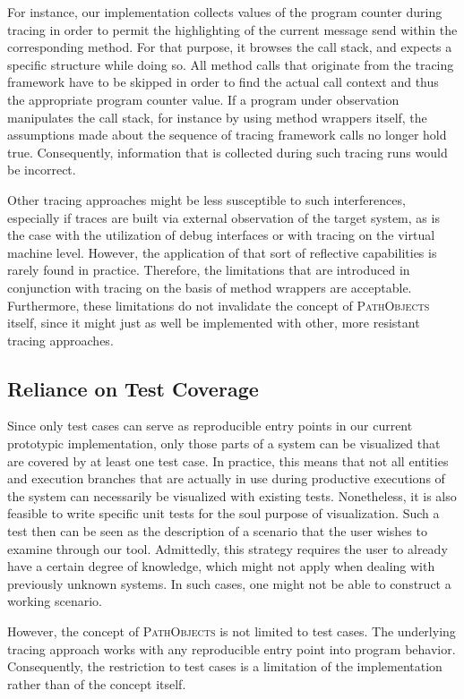 For instance, our implementation collects values of the program counter during tracing in order to permit the highlighting of the current message send within the corresponding method.
For that purpose, it browses the call stack, and expects a specific structure while doing so.
All method calls that originate from the tracing framework have to be skipped in order to find the actual call context and thus the appropriate program counter value.
If a program under observation manipulates the call stack, for instance by using method wrappers itself, the assumptions made about the sequence of tracing framework calls no longer hold true.
Consequently, information that is collected during such tracing runs would be incorrect.

Other tracing approaches might be less susceptible to such interferences, especially if traces are built via external observation of the target system, as is the case with the utilization of debug interfaces or with tracing on the virtual machine level.
However, the application of that sort of reflective capabilities is rarely found in practice.
Therefore, the limitations that are introduced in conjunction with tracing on the basis of method wrappers are acceptable.
Furthermore, these limitations do not invalidate the concept of \textsc{PathObjects} itself, since it might just as well be implemented with other, more resistant tracing approaches.

\subsection{Reliance on Test Coverage}
\label{ss:DiscussionLimitationsCoverage}
Since only test cases can serve as reproducible entry points in our current prototypic implementation, only those parts of a system can be visualized that are covered by at least one test case.
In practice, this means that not all entities and execution branches that are actually in use during productive executions of the system can necessarily be visualized with existing tests.
Nonetheless, it is also feasible to write specific unit tests for the soul purpose of visualization.
Such a test then can be seen as the description of a scenario that the user wishes to examine through our tool.
Admittedly, this strategy requires the user to already have a certain degree of knowledge, which might not apply when dealing with previously unknown systems.
In such cases, one might not be able to construct a working scenario.

However, the concept of \textsc{PathObjects} is not limited to test cases.
The underlying tracing approach works with any reproducible entry point into program behavior.
Consequently, the restriction to test cases is a limitation of the implementation rather than of the concept itself.


